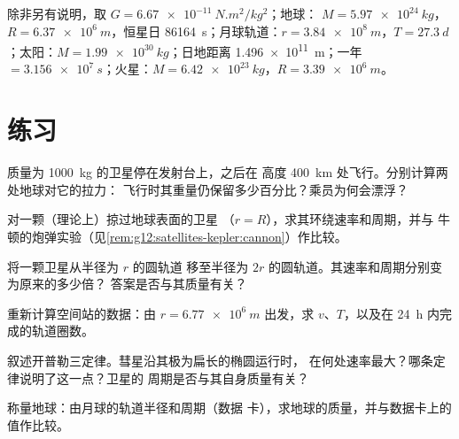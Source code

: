\begin{remark}[数据卡]\label{rem:g12:satellites-kepler:data}
除非另有说明，取 $G = \qty{6.67e-11}{N.m^2/kg^2}$；地球：
$M = \qty{5.97e24}{kg}$，$R = \qty{6.37e6}{m}$，恒星日
\qty{86164}{s}；月球轨道：$r = \qty{3.84e8}{m}$，$T =
\qty{27.3}{d}$；太阳：$M = \qty{1.99e30}{kg}$；日地距离
\qty{1.496e11}{m}；一年 $= \qty{3.156e7}{s}$；火星：$M =
\qty{6.42e23}{kg}$，$R = \qty{3.39e6}{m}$。
\end{remark}

\section{练习}

\begin{exercise}[$\star$]\label{exo:g12:satellites-kepler:1}
质量为 \qty{1000}{kg} 的卫星停在发射台上，之后在
高度 \qty{400}{km} 处飞行。分别计算两处地球对它的拉力：
飞行时其重量仍保留多少百分比？乘员为何会漂浮？
\end{exercise}

\begin{exercise}[$\star$]\label{exo:g12:satellites-kepler:2}
对一颗（理论上）掠过地球表面的卫星
（$r = R$），求其环绕速率和周期，并与
牛顿的炮弹实验（见\cref{rem:g12:satellites-kepler:cannon}）作比较。
\end{exercise}

\begin{exercise}[$\star$]\label{exo:g12:satellites-kepler:3}
将一颗卫星从半径为 $r$ 的圆轨道
移至半径为 $2r$ 的圆轨道。其速率和周期分别变为原来的多少倍？
答案是否与其质量有关？
\end{exercise}

\begin{exercise}[$\star$]\label{exo:g12:satellites-kepler:4}
重新计算空间站的数据：由 $r = \qty{6.77e6}{m}$ 出发，求
$v$、$T$，以及在 \qty{24}{h} 内完成的轨道圈数。
\end{exercise}

\begin{exercise}[$\star$]\label{exo:g12:satellites-kepler:5}
叙述开普勒三定律。彗星沿其极为扁长的椭圆运行时，
在何处速率最大？哪条定律说明了这一点？卫星的
周期是否与其自身质量有关？
\end{exercise}

\begin{exercise}[$\star\star$]\label{exo:g12:satellites-kepler:6}
称量地球：由月球的轨道半径和周期（数据
卡），求地球的质量，并与数据卡上的值作比较。
\end{exercise}

